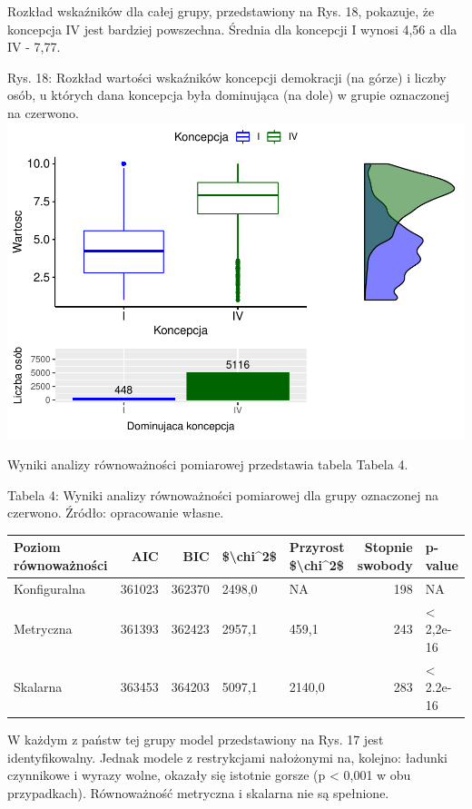 \documentclass[12pt]{article}
\begin{document}
Rozkład wskaźników dla całej grupy, przedstawiony na Rys. 18, pokazuje, że koncepcja IV jest bardziej powszechna. Średnia dla koncepcji I wynosi 4,56 a dla IV - 7,77.

Rys. 18: Rozkład wartości wskaźników koncepcji demokracji (na górze) i liczby osób, u których dana koncepcja była dominująca (na dole) w grupie oznaczonej na czerwono.
\includegraphics{text_ASA_files/figure-latex/stats-gr-3-1.pdf}

Wyniki analizy równoważności pomiarowej przedstawia tabela Tabela 4.

Tabela 4: Wyniki analizy równoważności pomiarowej dla grupy oznaczonej na czerwono. Źródło: opracowanie własne.

\begin{tabular}{l|r|r|l|l|r|l}
\hline
Poziom równoważności & AIC & BIC & \$\textbackslash{}chi\textasciicircum{}2\$ & Przyrost \$\textbackslash{}chi\textasciicircum{}2\$ & Stopnie swobody & p-value\\
\hline
Konfiguralna & 361023 & 362370 & 2498,0 & NA & 198 & NA\\
\hline
Metryczna & 361393 & 362423 & 2957,1 & 459,1 & 243 & < 2,2e-16\\
\hline
Skalarna & 363453 & 364203 & 5097,1 & 2140,0 & 283 & < 2.2e-16\\
\hline
\end{tabular}

W każdym z państw tej grupy model przedstawiony na Rys. 17 jest identyfikowalny. Jednak modele z restrykcjami nałożonymi na, kolejno: ładunki czynnikowe i wyrazy wolne, okazały się istotnie gorsze (p \textless{} 0,001 w obu przypadkach). Równoważność metryczna i skalarna nie są spełnione.
\end{document}
